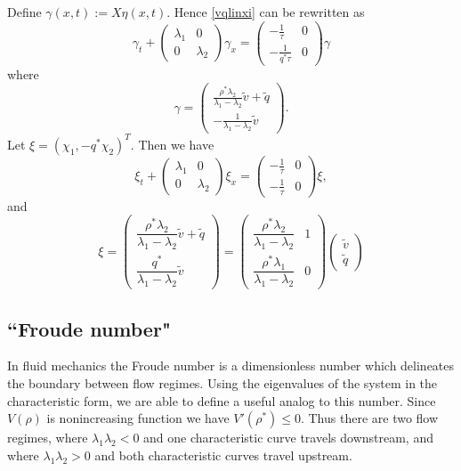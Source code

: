 \documentclass[preprint]{elsarticle}
\begin{document}
Define $\gamma(x,t) := X\eta(x,t)$. Hence \eqref{vqlinxi} can be rewritten as
\begin{equation} 
\gamma_t + \begin{pmatrix}
\lambda_1 & 0 \\
0 & \lambda_2
\end{pmatrix} \gamma_x = \begin{pmatrix}
-\frac{1}{\tau} & 0 \\
-\frac{1}{q^* \tau} & 0
\end{pmatrix} \gamma
\end{equation}
where 
\begin{equation}
\gamma = \begin{pmatrix}
\frac{\rho^*\lambda_2}{\lambda_1 - \lambda_2}\tilde{v} + \tilde{q} \\ 
-\frac{1}{\lambda_1 - \lambda_2}\tilde{v} 
\end{pmatrix}. 
\end{equation}
Let $\xi = (\chi_1, -q^*\chi_2)^T$. Then we have
\begin{equation} \label{vqlindiag}
\xi_t + \begin{pmatrix}
\lambda_1 & 0 \\
0 & \lambda_2
\end{pmatrix} \xi_x = \begin{pmatrix}
-\frac{1}{\tau} & 0 \\
-\frac{1}{\tau} & 0
\end{pmatrix} \xi,
\end{equation}
and
\begin{equation} \label{eq:Riemannzeta}
\xi = \begin{pmatrix}
\dfrac{\rho^*\lambda_2}{\lambda_1 - \lambda_2}\tilde{v} + \tilde{q} \\ 
\dfrac{q^*}{\lambda_1 - \lambda_2}\tilde{v} 
\end{pmatrix} = 
\begin{pmatrix}
\dfrac{\rho^*\lambda_2}{\lambda_1-\lambda_2} & 1\\
\dfrac{\rho^*\lambda_1}{\lambda_1-\lambda_2} & 0
\end{pmatrix} \begin{pmatrix}
\tilde{v} \\ \tilde{q} 
\end{pmatrix}
\end{equation}

\subsection{``Froude number"}
In fluid mechanics the Froude number is a dimensionless number which delineates the boundary between flow regimes. Using the eigenvalues of the system in the characteristic form, we are able to define a useful analog to this number.
Since $V(\rho)$ is nonincreasing function we have $V'(\rho^*) \leq 0$. Thus there are two flow regimes, where $\lambda_1 \lambda_2 < 0$ and one characteristic curve travels downstream, and where $\lambda_1 \lambda_2 > 0$ and both characteristic curves travel upstream. 
\end{document}
